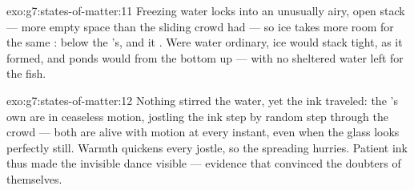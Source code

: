 \begin{solution}{exo:g7:states-of-matter:11}
Freezing water locks into an unusually airy, open stack --- more
empty space than the sliding crowd had --- so ice takes more room
for the same :  below the 's, and it
. Were water ordinary, ice would stack tight,  as it
formed, and ponds would  from the bottom up --- with no
sheltered water left for the fish.
\end{solution}

\begin{solution}{exo:g7:states-of-matter:12}
Nothing stirred the water, yet the ink traveled: the 's own
 are in ceaseless motion, jostling the ink 
step by random step through the crowd --- both  are alive
with motion at every instant, even when the glass looks
perfectly still. Warmth quickens every jostle, so the spreading
hurries. Patient ink thus made the invisible dance visible ---
evidence that convinced the doubters of  themselves.
\end{solution}

